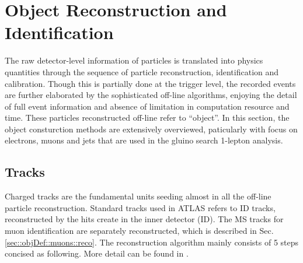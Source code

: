 \section{Object Reconstruction and Identification}  \label{sec::objDef}
The raw detector-level information of particles is translated into physics quantities through the sequence of particle reconstruction, identification and calibration.
Though this is partially done at the trigger level, the recorded events are further elaborated by the sophisticated off-line algorithms, enjoying the detail of full event information and absence of limitation in computation resource and time.
These particles reconstructed off-line refer to ``object''. In this section, the object consturction methods are extensively overviewed, paticularly with focus on electrons, muons and jets that are used in the gluino search 1-lepton analysis.



\subsection{Tracks} \label{sec::objDef::tracks}
Charged tracks are the fundamental units seeding almost in all the off-line particle reconstruction. 
Standard tracks used in ATLAS refers to ID tracks, reconstructed by the hits create in the inner detector (ID).
The MS tracks for muon identification are separately reconstructed, which is described in Sec. \ref{sec::objDef::muons::reco}.
The reconstruction algorithm mainly consists of 5 steps concised as following. 
More detail can be found in \cite{130_trackingRun2}.



